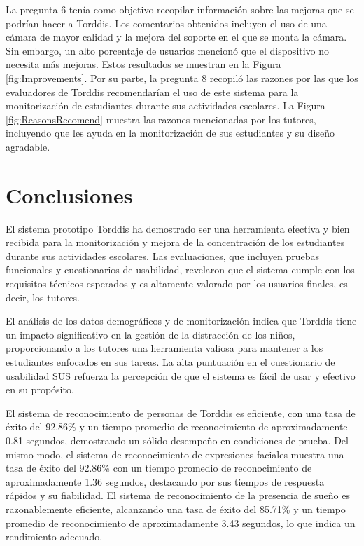 \documentclass[a4paper,fleqn]{cas-sc}
\begin{document}
				La pregunta 6 tenía como objetivo recopilar información sobre las mejoras que se podrían hacer a Torddis. Los comentarios obtenidos incluyen el uso de una cámara de mayor calidad y la mejora del soporte en el que se monta la cámara. Sin embargo, un alto porcentaje de usuarios mencionó que el dispositivo no necesita más mejoras. Estos resultados se muestran en la Figura \ref{fig:Improvements}. Por su parte, la pregunta 8 recopiló las razones por las que los evaluadores de Torddis recomendarían el uso de este sistema para la monitorización de estudiantes durante sus actividades escolares. La Figura \ref{fig:ReasonsRecomend} muestra las razones mencionadas por los tutores, incluyendo que les ayuda en la monitorización de sus estudiantes y su diseño agradable.
	
	\section{Conclusiones}
	\label{seccion:Seis}
		El sistema prototipo Torddis ha demostrado ser una herramienta efectiva y bien recibida para la monitorización y mejora de la concentración de los estudiantes durante sus actividades escolares. Las evaluaciones, que incluyen pruebas funcionales y cuestionarios de usabilidad, revelaron que el sistema cumple con los requisitos técnicos esperados y es altamente valorado por los usuarios finales, es decir, los tutores.
		
		El análisis de los datos demográficos y de monitorización indica que Torddis tiene un impacto significativo en la gestión de la distracción de los niños, proporcionando a los tutores una herramienta valiosa para mantener a los estudiantes enfocados en sus tareas. La alta puntuación en el cuestionario de usabilidad SUS refuerza la percepción de que el sistema es fácil de usar y efectivo en su propósito.
		
		El sistema de reconocimiento de personas de Torddis es eficiente, con una tasa de éxito del 92.86\% y un tiempo promedio de reconocimiento de aproximadamente 0.81 segundos, demostrando un sólido desempeño en condiciones de prueba. Del mismo modo, el sistema de reconocimiento de expresiones faciales muestra una tasa de éxito del 92.86\% con un tiempo promedio de reconocimiento de aproximadamente 1.36 segundos, destacando por sus tiempos de respuesta rápidos y su fiabilidad. El sistema de reconocimiento de la presencia de sueño es razonablemente eficiente, alcanzando una tasa de éxito del 85.71\% y un tiempo promedio de reconocimiento de aproximadamente 3.43 segundos, lo que indica un rendimiento adecuado.
		
\end{document}
